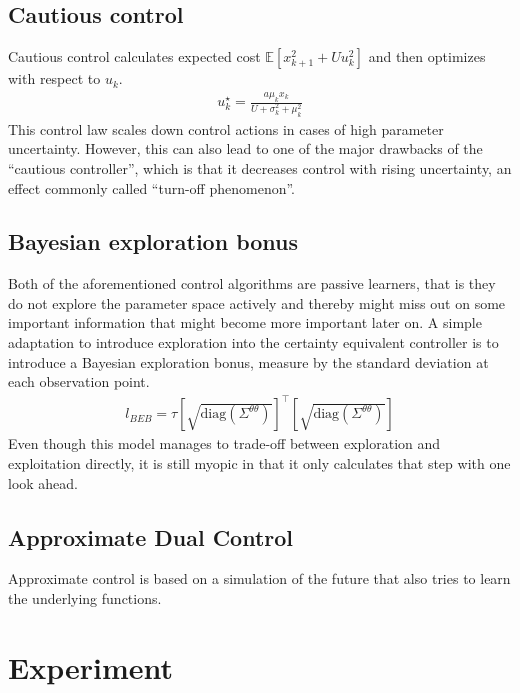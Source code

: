 \documentclass[10pt,letterpaper]{article}
\begin{document}
\subsection{Cautious control}
Cautious control  calculates expected cost $\mathbb{E}[x_{k+1}^2+Uu_k^2]$ and then optimizes with respect to $u_k$.
\begin{align*}
u_k^\star=\frac{a\mu_kx_k}{U+\sigma_k^2+\mu_k^2}
\end{align*}
This control law scales down control actions in cases of high parameter uncertainty. However, this can also lead to one of the major drawbacks of the ``cautious controller'', which is that it decreases control with rising uncertainty, an effect commonly called ``turn-off phenomenon''. 

\subsection{Bayesian exploration bonus}
Both of the aforementioned control algorithms are passive learners, that is they do not explore the parameter space actively and thereby might miss out on some important information that might become more important later on. 
A simple adaptation to introduce exploration into the certainty equivalent controller is to introduce a Bayesian exploration bonus, measure by the standard deviation at each observation point.
\begin{align*}
l_{BEB}=\tau\left[\sqrt{\text{diag}(\Sigma^{\theta\theta})} \right]^\top \left[\sqrt{\text{diag}(\Sigma^{\theta\theta})} \right]
\end{align*}
Even though this model manages to trade-off between exploration and exploitation directly, it is still myopic in that it only calculates that step with one look ahead.

\subsection{Approximate Dual Control}
Approximate control is based on a simulation of the future that also tries to learn the underlying functions.
\section{Experiment}
\end{document}
